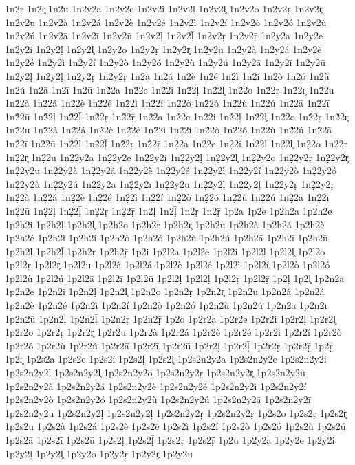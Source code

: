 {1n2ṛ
1n2r̥
1n2u
1n2v2a
1n2v2e
1n2v2i
1n2v2ḷ
1n2v2l̥
1n2v2o
1n2v2ṛ
1n2v2r̥
1n2v2u
1n2v2à
1n2v2á
1n2v2è
1n2v2é
1n2v2ì
1n2v2í
1n2v2ò
1n2v2ó
1n2v2ù
1n2v2ú
1n2v2ā
1n2v2ī
1n2v2ū
1n2v2ḷ
1n2v2ḹ
1n2v2ṛ
1n2v2ṝ
1n2y2a
1n2y2e
1n2y2i
1n2y2ḷ
1n2y2l̥
1n2y2o
1n2y2ṛ
1n2y2r̥
1n2y2u
1n2y2à
1n2y2á
1n2y2è
1n2y2é
1n2y2ì
1n2y2í
1n2y2ò
1n2y2ó
1n2y2ù
1n2y2ú
1n2y2ā
1n2y2ī
1n2y2ū
1n2y2ḷ
1n2y2ḹ
1n2y2ṛ
1n2y2ṝ
1n2à
1n2á
1n2è
1n2é
1n2ì
1n2í
1n2ò
1n2ó
1n2ù
1n2ú
1n2ā
1n2ī
1n2ū
1n2̃2a
1n2̃2e
1n2̃2i
1n2̃2ḷ
1n2̃2l̥
1n2̃2o
1n2̃2ṛ
1n2̃2r̥
1n2̃2u
1n2̃2à
1n2̃2á
1n2̃2è
1n2̃2é
1n2̃2ì
1n2̃2í
1n2̃2ò
1n2̃2ó
1n2̃2ù
1n2̃2ú
1n2̃2ā
1n2̃2ī
1n2̃2ū
1n2̃2ḷ
1n2̃2ḹ
1n2̃2ṛ
1n2̃2ṝ
1n2̇2a
1n2̇2e
1n2̇2i
1n2̇2ḷ
1n2̇2l̥
1n2̇2o
1n2̇2ṛ
1n2̇2r̥
1n2̇2u
1n2̇2à
1n2̇2á
1n2̇2è
1n2̇2é
1n2̇2ì
1n2̇2í
1n2̇2ò
1n2̇2ó
1n2̇2ù
1n2̇2ú
1n2̇2ā
1n2̇2ī
1n2̇2ū
1n2̇2ḷ
1n2̇2ḹ
1n2̇2ṛ
1n2̇2ṝ
1n2̣2a
1n2̣2e
1n2̣2i
1n2̣2ḷ
1n2̣2l̥
1n2̣2o
1n2̣2ṛ
1n2̣2r̥
1n2̣2u
1n2̣2y2a
1n2̣2y2e
1n2̣2y2i
1n2̣2y2ḷ
1n2̣2y2l̥
1n2̣2y2o
1n2̣2y2ṛ
1n2̣2y2r̥
1n2̣2y2u
1n2̣2y2à
1n2̣2y2á
1n2̣2y2è
1n2̣2y2é
1n2̣2y2ì
1n2̣2y2í
1n2̣2y2ò
1n2̣2y2ó
1n2̣2y2ù
1n2̣2y2ú
1n2̣2y2ā
1n2̣2y2ī
1n2̣2y2ū
1n2̣2y2ḷ
1n2̣2y2ḹ
1n2̣2y2ṛ
1n2̣2y2ṝ
1n2̣2à
1n2̣2á
1n2̣2è
1n2̣2é
1n2̣2ì
1n2̣2í
1n2̣2ò
1n2̣2ó
1n2̣2ù
1n2̣2ú
1n2̣2ā
1n2̣2ī
1n2̣2ū
1n2̣2ḷ
1n2̣2ḹ
1n2̣2ṛ
1n2̣2ṝ
1n2ḷ
1n2ḹ
1n2ṛ
1n2ṝ
1p2a
1p2e
1p2h2a
1p2h2e
1p2h2i
1p2h2ḷ
1p2h2l̥
1p2h2o
1p2h2ṛ
1p2h2r̥
1p2h2u
1p2h2à
1p2h2á
1p2h2è
1p2h2é
1p2h2ì
1p2h2í
1p2h2ò
1p2h2ó
1p2h2ù
1p2h2ú
1p2h2ā
1p2h2ī
1p2h2ū
1p2h2ḷ
1p2h2ḹ
1p2h2ṛ
1p2h2ṝ
1p2i
1p2l2a
1p2l2e
1p2l2i
1p2l2ḷ
1p2l2l̥
1p2l2o
1p2l2ṛ
1p2l2r̥
1p2l2u
1p2l2à
1p2l2á
1p2l2è
1p2l2é
1p2l2ì
1p2l2í
1p2l2ò
1p2l2ó
1p2l2ù
1p2l2ú
1p2l2ā
1p2l2ī
1p2l2ū
1p2l2ḷ
1p2l2ḹ
1p2l2ṛ
1p2l2ṝ
1p2ḷ
1p2l̥
1p2n2a
1p2n2e
1p2n2i
1p2n2ḷ
1p2n2l̥
1p2n2o
1p2n2ṛ
1p2n2r̥
1p2n2u
1p2n2à
1p2n2á
1p2n2è
1p2n2é
1p2n2ì
1p2n2í
1p2n2ò
1p2n2ó
1p2n2ù
1p2n2ú
1p2n2ā
1p2n2ī
1p2n2ū
1p2n2ḷ
1p2n2ḹ
1p2n2ṛ
1p2n2ṝ
1p2o
1p2r2a
1p2r2e
1p2r2i
1p2r2ḷ
1p2r2l̥
1p2r2o
1p2r2ṛ
1p2r2r̥
1p2r2u
1p2r2à
1p2r2á
1p2r2è
1p2r2é
1p2r2ì
1p2r2í
1p2r2ò
1p2r2ó
1p2r2ù
1p2r2ú
1p2r2ā
1p2r2ī
1p2r2ū
1p2r2ḷ
1p2r2ḹ
1p2r2ṛ
1p2r2ṝ
1p2ṛ
1p2r̥
1p2s2a
1p2s2e
1p2s2i
1p2s2ḷ
1p2s2l̥
1p2s2n2y2a
1p2s2n2y2e
1p2s2n2y2i
1p2s2n2y2ḷ
1p2s2n2y2l̥
1p2s2n2y2o
1p2s2n2y2ṛ
1p2s2n2y2r̥
1p2s2n2y2u
1p2s2n2y2à
1p2s2n2y2á
1p2s2n2y2è
1p2s2n2y2é
1p2s2n2y2ì
1p2s2n2y2í
1p2s2n2y2ò
1p2s2n2y2ó
1p2s2n2y2ù
1p2s2n2y2ú
1p2s2n2y2ā
1p2s2n2y2ī
1p2s2n2y2ū
1p2s2n2y2ḷ
1p2s2n2y2ḹ
1p2s2n2y2ṛ
1p2s2n2y2ṝ
1p2s2o
1p2s2ṛ
1p2s2r̥
1p2s2u
1p2s2à
1p2s2á
1p2s2è
1p2s2é
1p2s2ì
1p2s2í
1p2s2ò
1p2s2ó
1p2s2ù
1p2s2ú
1p2s2ā
1p2s2ī
1p2s2ū
1p2s2ḷ
1p2s2ḹ
1p2s2ṛ
1p2s2ṝ
1p2u
1p2y2a
1p2y2e
1p2y2i
1p2y2ḷ
1p2y2l̥
1p2y2o
1p2y2ṛ
1p2y2r̥
1p2y2u
}
